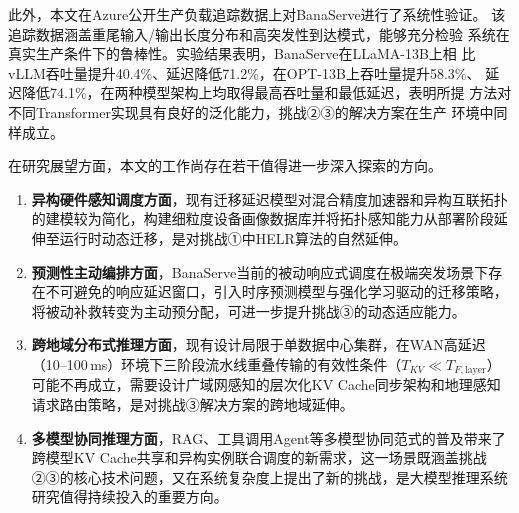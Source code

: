 \begin{conclusion}
此外，本文在Azure公开生产负载追踪数据上对BanaServe进行了系统性验证。
该追踪数据涵盖重尾输入/输出长度分布和高突发性到达模式，能够充分检验
系统在真实生产条件下的鲁棒性。实验结果表明，BanaServe在LLaMA-13B上相
比vLLM吞吐量提升40.4\%、延迟降低71.2\%，在OPT-13B上吞吐量提升58.3\%、
延迟降低74.1\%，在两种模型架构上均取得最高吞吐量和最低延迟，表明所提
方法对不同Transformer实现具有良好的泛化能力，挑战②③的解决方案在生产
环境中同样成立。




在研究展望方面，本文的工作尚存在若干值得进一步深入探索的方向。
\begin{enumerate}
    
\item \textbf{异构硬件感知调度方面}，现有迁移延迟模型对混合精度加速器和异构互联拓扑的建模较为简化，构建细粒度设备画像数据库并将拓扑感知能力从部署阶段延伸至运行时动态迁移，是对挑战①中HELR算法的自然延伸。

\item \textbf{预测性主动编排方面}，BanaServe当前的被动响应式调度在极端突发场景下存在不可避免的响应延迟窗口，引入时序预测模型与强化学习驱动的迁移策略，将被动补救转变为主动预分配，可进一步提升挑战③的动态适应能力。

\item \textbf{跨地域分布式推理方面}，现有设计局限于单数据中心集群，在WAN高延迟（10--100\,ms）环境下三阶段流水线重叠传输的有效性条件（$T_{KV}\ll T_{F,\text{layer}}$）可能不再成立，需要设计广域网感知的层次化KV Cache同步架构和地理感知请求路由策略，是对挑战③解决方案的跨地域延伸。

\item \textbf{多模型协同推理方面}，RAG、工具调用Agent等多模型协同范式的普及带来了跨模型KV Cache共享和异构实例联合调度的新需求，这一场景既涵盖挑战②③的核心技术问题，又在系统复杂度上提出了新的挑战，是大模型推理系统研究值得持续投入的重要方向。

\end{enumerate}

\end{conclusion}

